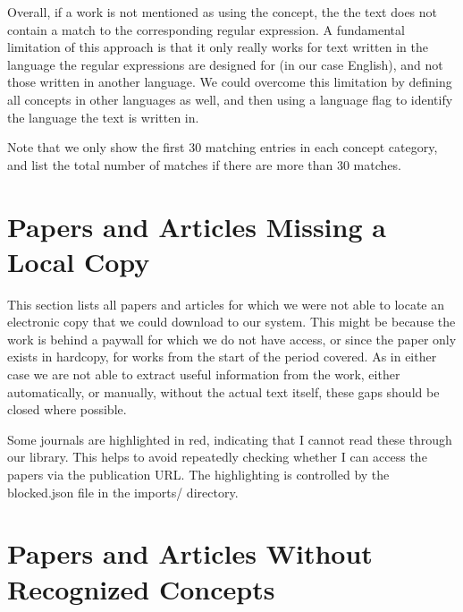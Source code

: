 \documentclass[a4paper]{article}
\begin{document}
Overall, if a work is not mentioned as using the concept, the the text does not contain a match to the corresponding regular expression. A fundamental limitation of this approach is that it only really works for text written in the language the regular expressions are designed for (in our case English), and not those written in another language. We could overcome this limitation by defining all concepts in other languages as well, and then using a language flag to identify the language the text is written in. 

Note that we only show the first 30 matching entries in each concept category, and list the total number of matches if there are more than 30 matches.






\clearpage
{}
{}





\appendix
\clearpage
\section{Papers and Articles Missing a Local Copy}

This section lists all papers and articles for which we were not able to locate an electronic copy that we could download to our system. This might be because the work is behind a paywall for which we do not have access, or since the paper only exists in hardcopy, for works from the start of the period covered. As in either case we are not able to extract useful information from the work, either automatically, or manually, without the actual text itself, these gaps should be closed where possible.

Some journals are highlighted in red, indicating that I cannot read these through our library. This helps to avoid repeatedly checking whether I can access the papers via the publication URL. The highlighting is controlled by the blocked.json file in the imports/ directory.









\clearpage
\section{Papers and Articles Without Recognized Concepts}
\end{document}
